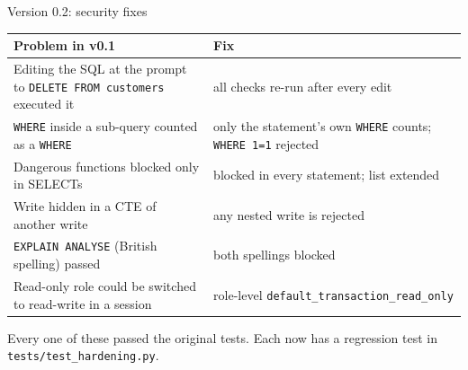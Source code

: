 \documentclass[aspectratio=169,10pt]{beamer}
\begin{document}
\begin{frame}{Version 0.2: security fixes}
  \footnotesize
  \begin{tabular}{@{}p{5.6cm}p{6.2cm}@{}}
    \toprule
    \textbf{Problem in v0.1} & \textbf{Fix} \\
    \midrule
    Editing the SQL at the prompt to \texttt{DELETE FROM customers} executed it
      & all checks re-run after every edit \\
    \texttt{WHERE} inside a sub-query counted as a \texttt{WHERE}
      & only the statement's own \texttt{WHERE} counts; \texttt{WHERE 1=1} rejected \\
    Dangerous functions blocked only in SELECTs
      & blocked in every statement; list extended \\
    Write hidden in a CTE of another write
      & any nested write is rejected \\
    \texttt{EXPLAIN ANALYSE} (British spelling) passed
      & both spellings blocked \\
    Read-only role could be switched to read-write in a session
      & role-level \texttt{default\_transaction\_read\_only} \\
    \bottomrule
  \end{tabular}

  \vspace{6pt}
  \begin{alertblock}{}
    \footnotesize Every one of these passed the original tests. Each now has a regression
    test in \texttt{tests/test\_hardening.py}.
  \end{alertblock}
\end{frame}
\end{document}
